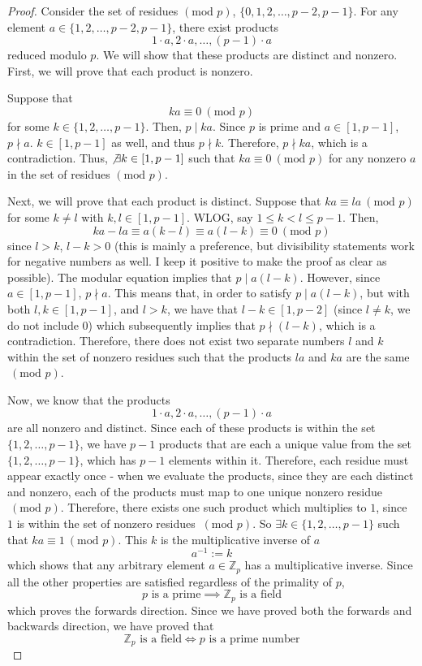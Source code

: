 \begin{proof}
Consider the set of residues $(\text{mod }p)$, $\{ 0, 1, 2, \ldots, p-2, p-1\} $. For any element $a \in \{1, 2, \ldots, p-2, p-1\}$, there exist products 
\[
1 \cdot a, 2 \cdot a, \ldots, (p-1)\cdot a
\]
reduced modulo $p$. We will show that these products are distinct and nonzero. First, we will prove that each product is nonzero.

Suppose that 
\[
ka \equiv 0~(\text{mod }p)
\]
for some $k \in \{1, 2, \ldots, p-1\}$. Then, $p \mid ka$. Since $p$ is prime and $a \in [1, p-1]$, $p \nmid a$. $k \in [1, p-1]$ as well, and thus $p \nmid k$. Therefore, $p \nmid ka$, which is a contradiction. Thus, $\not\exists k \in [1, p-1]$ such that $ka \equiv 0~(\text{mod }p)$ for any nonzero $a$ in the set of residues $(\text{mod }p)$.

Next, we will prove that each product is distinct. Suppose that $ka \equiv la ~(\text{mod }p)$ for some $k\neq l$ with $ k, l \in [1, p-1]$. WLOG, say $1 \leq k < l \leq p-1$. Then, 
\[
ka - la \equiv a(k-l)\equiv a(l-k)\equiv 0 ~(\text{mod }p)
\]
since $l > k$, $l-k > 0$ (this is mainly a preference, but divisibility statements work for negative numbers as well. I keep it positive to make the proof as clear as possible). The modular equation implies that $p \mid a(l-k)$. However, since $a \in [1, p-1]$, $p \nmid a$. This means that, in order to satisfy $p \mid a(l-k)$, but with both $l, k \in [1, p-1]$, and $l > k$, we have that $l-k \in [1, p-2]$ (since $l \neq k$, we do not include 0) which subsequently implies that $p \nmid (l-k)$, which is a contradiction. Therefore, there does not exist two separate numbers $l$ and $k$ within the set of nonzero residues such that the products $la$ and $ka$ are the same $~(\text{mod }p)$. 

Now, we know that the products
\[
1 \cdot a, 2 \cdot a, \ldots, (p-1)\cdot a
\]
are all nonzero and distinct. Since each of these products is within the set $\{ 1, 2, \ldots, p-1 \}$, we have $p-1$ products that are each a unique value from the set $\{ 1, 2, \ldots, p-1 \}$, which has $p-1$ elements within it. Therefore, each residue must appear exactly once - when we evaluate the products, since they are each distinct and nonzero, each of the products must map to one unique nonzero residue $~(\text{mod }p)$. Therefore, there exists one such product which multiplies to $1$, since $1$ is within the set of nonzero residues $~(\text{mod }p)$. So $\exists k \in \{1, 2, \ldots, p-1\}$ such that $ka \equiv 1 ~(\text{mod }p)$. This $k$ is the multiplicative inverse of $a$
\[
a^{-1} := k
\]
which shows that any arbitrary element $a \in \mathbb{Z}_p$ has a multiplicative inverse. Since all the other properties are satisfied regardless of the primality of $p$, 
\[
\text{$p$ is a prime} \implies \text{$\mathbb{Z}_p$ is a field}
\]
which proves the forwards direction. Since we have proved both the forwards and backwards direction, we have proved that 
\[
\text{$\mathbb{Z}_p$ is a field} \iff \text{$p$ is a prime number}
\]
\end{proof}

